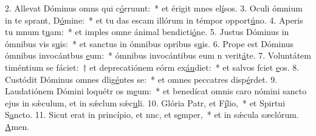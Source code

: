 2. Allevat Dóminus omns qui c\uline{ó}rruunt:~* et érigit mnes el\uline{í}sos.
3. Oculi ómnium in te sprant, D\uline{ó}mine:~* et tu das escam illórum in témpor opport\uline{ú}no.
4. Aperis tu mnum t\uline{u}am:~* et imples omne ánimal bendicti\uline{ó}ne.
5. Justus Dóminus in ómnibus vis s\uline{u}is:~* et sanctus in ómnibus opribus s\uline{u}is.
6. Prope est Dóminus ómnibus invocántbus \uline{e}um:~* ómnibus invocántibus eum n verit\uline{á}te.
7. Voluntátem timéntium se fáciet:~† et deprecatiónem eórm ex\uline{áu}diet:~* et salvos fciet \uline{e}os.
8. Custódit Dóminus omnes dlig\uline{é}ntes se:~* et omnes peccatres disp\uline{é}rdet.
9. Laudatiónem Dómini loquétr os m\uline{e}um:~* et benedícat omnis caro nómini sancto ejus in sǽculum, et in sǽclum sǽc\uline{u}li.
10. Glória Patr, et F\uline{í}lio,~* et Spirtui S\uline{a}ncto.
11. Sicut erat in princípio, et nnc, et s\uline{e}mper,~* et in sǽcula sæclórum. \uline{A}men.
